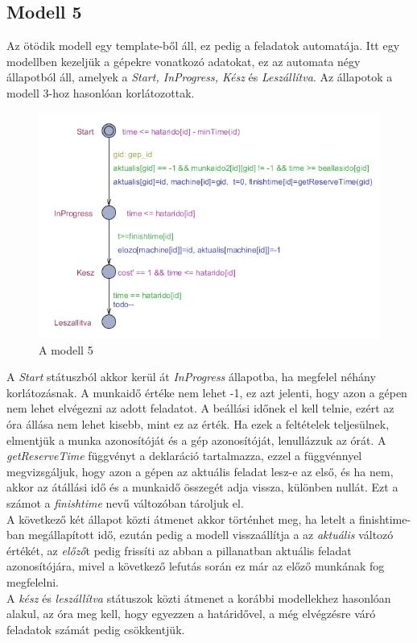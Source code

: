\documentclass {report}
\begin{document}
\subsection{Modell 5}
Az ötödik modell egy template-ből áll, ez pedig a feladatok automatája. Itt egy modellben kezeljük a gépekre vonatkozó adatokat, ez az automata négy állapotból áll, amelyek a \emph{Start, InProgress, Kész} és \emph{Leszállítva}. Az állapotok a modell 3-hoz hasonlóan korlátozottak.\\
\begin{figure}[htpb]
\begin{center}
\includegraphics[height=6.5 cm]{modell_5}
\caption{A modell 5}
\end{center}
\end{figure}
 A \emph{Start} státuszból akkor kerül át \emph{InProgress} állapotba, ha megfelel néhány korlátozásnak. A munkaidő értéke nem lehet -1, ez azt jelenti, hogy azon a gépen nem lehet elvégezni az adott feladatot. A beállási időnek el kell telnie, ezért az óra állása nem lehet kisebb, mint ez az érték. Ha ezek a feltételek teljesülnek, elmentjük a munka azonosítóját és a gép azonosítóját, lenullázzuk az órát. A \emph{getReserveTime} függvényt a deklaráció tartalmazza, ezzel a függvénnyel megvizsgáljuk, hogy azon a gépen az aktuális feladat lesz-e az első, és ha nem, akkor az átállási idő és a munkaidő összegét adja vissza, különben nullát. Ezt a számot a \emph{finishtime} nevű változóban tároljuk el.\\
 A következő két állapot közti átmenet akkor történhet meg, ha letelt a finishtime-ban megállapított idő, ezután pedig a modell visszaállítja a az \emph{aktuális} változó értékét, az \emph{előző}t pedig frissíti az abban a pillanatban aktuális feladat azonosítójára, mivel a következő lefutás során ez már az előző munkának fog megfelelni. \\
 A \emph{kész} és \emph{leszállítva} státuszok közti átmenet a korábbi modellekhez hasonlóan alakul, az óra meg kell, hogy egyezzen a határidővel, a még elvégzésre váró feladatok számát pedig csökkentjük.
\end{document}
